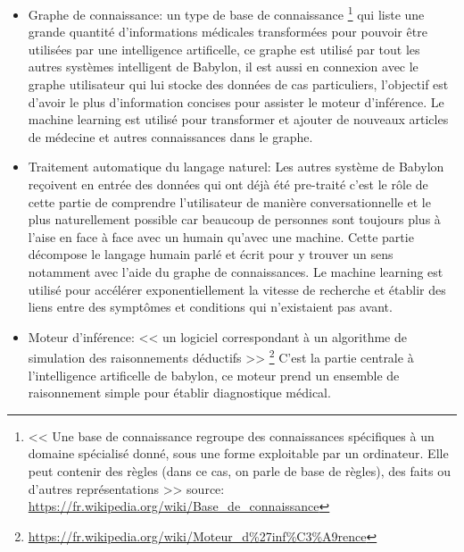             \begin{itemize}
                \item Graphe de connaissance: un type de base de connaissance
                    \footnote{
                        << Une base de connaissance regroupe des connaissances spécifiques à un 
                        domaine spécialisé donné, sous une forme exploitable par un ordinateur. 
                        Elle peut contenir des règles (dans ce cas, on parle de base de règles), 
                        des faits ou d'autres représentations >> \newline 
                        source: \url{https://fr.wikipedia.org/wiki/Base_de_connaissance}
                    }
                    qui liste une grande quantité d'informations médicales transformées 
                    pour pouvoir être utilisées par une intelligence artificelle, 
                    ce graphe est utilisé par tout les autres systèmes intelligent 
                    de Babylon, il est aussi en connexion avec le graphe utilisateur 
                    qui lui stocke des données de cas particuliers,
                    l'objectif est d'avoir le plus d'information concises 
                    pour assister le moteur d'inférence. 
                    Le machine learning est utilisé pour transformer et ajouter de nouveaux articles 
                    de médecine et autres connaissances dans le graphe.
                    \newline

                \item Traitement automatique du langage naturel: 
                Les autres système de Babylon reçoivent en entrée des données qui ont déjà 
                été pre-traité c'est le rôle de cette partie de comprendre l'utilisateur 
                de manière conversationnelle et le plus naturellement possible car
                beaucoup de personnes sont toujours plus à l'aise en face à face 
                avec un humain qu'avec une machine. Cette partie décompose 
                le langage humain parlé et écrit pour y trouver un sens notamment avec l'aide 
                du graphe de connaissances. Le machine learning est utilisé pour accélérer exponentiellement 
                la vitesse de recherche et établir des liens entre des symptômes et conditions 
                qui n'existaient pas avant.
                \newline

                \item Moteur d'inférence: 
                << un logiciel correspondant à un algorithme de simulation des raisonnements déductifs >>
                \footnote{\url{https://fr.wikipedia.org/wiki/Moteur_d\%27inf\%C3\%A9rence}}
                C'est la partie centrale à l'intelligence artificelle de babylon, ce moteur 
                prend un ensemble de raisonnement simple pour établir diagnostique médical.
                \newline
            \end{itemize} 
            \newpage


